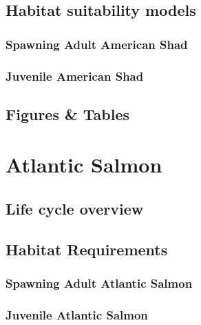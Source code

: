\documentclass[
]{book}
\begin{document}
\hypertarget{habitat-suitability-models-2}{%
\section{Habitat suitability models}\label{habitat-suitability-models-2}}

\hypertarget{spawning-adult-american-shad-1}{%
\subsection{Spawning Adult American Shad}\label{spawning-adult-american-shad-1}}

\hypertarget{juvenile-american-shad-1}{%
\subsection{Juvenile American Shad}\label{juvenile-american-shad-1}}

\hypertarget{figures-tables-2}{%
\section{Figures \& Tables}\label{figures-tables-2}}

\hypertarget{atlantic-salmon}{%
\chapter{Atlantic Salmon}\label{atlantic-salmon}}

\hypertarget{life-cycle-overview-3}{%
\section{Life cycle overview}\label{life-cycle-overview-3}}

\hypertarget{habitat-requirements-3}{%
\section{Habitat Requirements}\label{habitat-requirements-3}}

\hypertarget{spawning-adult-atlantic-salmon}{%
\subsection{Spawning Adult Atlantic Salmon}\label{spawning-adult-atlantic-salmon}}

\hypertarget{juvenile-atlantic-salmon}{%
\subsection{Juvenile Atlantic Salmon}\label{juvenile-atlantic-salmon}}
\end{document}

